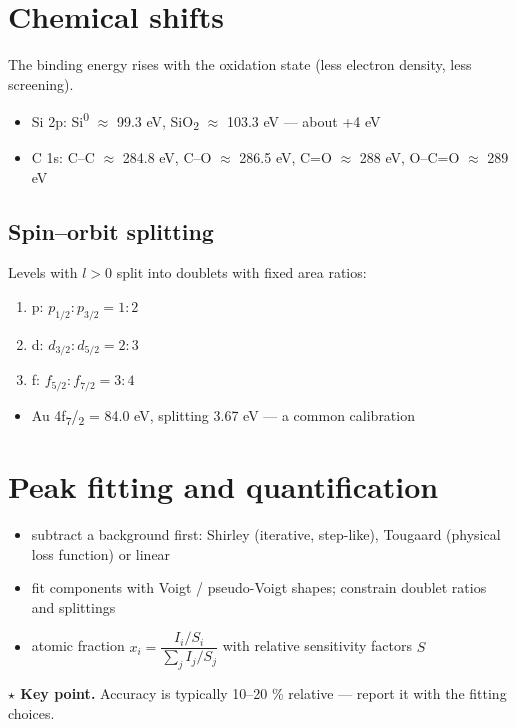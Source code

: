 \documentclass[11pt]{article}
\newcommand\knotetime[1]{\leavevmode\llap{\color{knotemuted}\scriptsize #1\hspace{1em}}}
\newcommand\knotekey[2][]{\par\noindent#1\colorbox{knotekey!12}{\parbox{\dimexpr\linewidth-2\fboxsep}{%
  \textbf{\color{knotekey}$\star$ Key point.} #2}}\par}
\newenvironment{knotechunk}{}{}
\begin{document}
\begin{knotechunk}
\section{Chemical shifts}

\knotetime{10:25}The binding energy rises with the oxidation state (less electron density, less screening).

\begin{itemize}\setlength{\itemsep}{0pt}\setlength{\parskip}{0pt}
  \item Si 2p: Si\textsuperscript{0} \ensuremath{\approx} 99.3 eV, SiO\textsubscript{2} \ensuremath{\approx} 103.3 eV — about +4 eV
  \item C 1s: C–C \ensuremath{\approx} 284.8 eV, C–O \ensuremath{\approx} 286.5 eV, C=O \ensuremath{\approx} 288 eV, O–C=O \ensuremath{\approx} 289 eV
\end{itemize}

\subsection{Spin–orbit splitting}

\knotetime{12:05}Levels with $l > 0$ split into doublets with fixed area ratios:

\begin{enumerate}\setlength{\itemsep}{0pt}\setlength{\parskip}{0pt}
  \item p: $p_{1/2} : p_{3/2} = 1 : 2$
  \item d: $d_{3/2} : d_{5/2} = 2 : 3$
  \item f: $f_{5/2} : f_{7/2} = 3 : 4$
\end{enumerate}
\begin{itemize}\setlength{\itemsep}{0pt}\setlength{\parskip}{0pt}
  \item Au 4f\textsubscript{7}/\textsubscript{2} = 84.0 eV, splitting 3.67 eV — a common calibration
\end{itemize}
\end{knotechunk}

\begin{knotechunk}
\section{Peak fitting and quantification}

\begin{itemize}\setlength{\itemsep}{0pt}\setlength{\parskip}{0pt}
  \item subtract a background first: Shirley (iterative, step-like), Tougaard (physical loss function) or linear
  \item fit components with Voigt / pseudo-Voigt shapes; constrain doublet ratios and splittings
  \item atomic fraction $x_i = \dfrac{I_i/S_i}{\sum_j I_j/S_j}$ with relative sensitivity factors $S$
\end{itemize}

\knotekey[\knotetime{23:40}]{Accuracy is typically 10–20 \% relative — report it with the fitting choices.}
\end{knotechunk}
\end{document}
